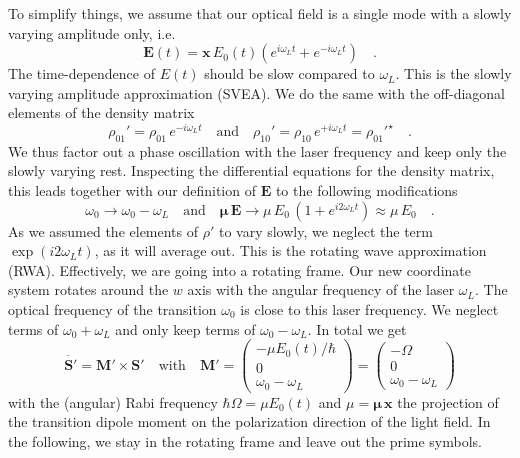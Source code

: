 To simplify things, we assume that our optical field is a single mode with a slowly varying amplitude only, i.e.
\begin{equation}
 \boldsymbol{E}(t) = \boldsymbol{x} \, E_0(t) \left( e^{i \omega_L t} + e^{-i \omega_L t} \right) \quad .
\end{equation}
The time-dependence of $E(t)$ should be slow compared to $\omega_L$. This is the slowly varying amplitude approximation (SVEA). We do the same with the off-diagonal elements of the density matrix
\begin{equation}
 \rho_{01}' = \rho_{01} \, e^{-i \omega_L t}  \quad \text{and} \quad
 \rho_{10}' = \rho_{10} \, e^{+i \omega_L t} = \rho_{01}'^\star \quad .
\end{equation}
We thus factor out a phase oscillation with the laser frequency and keep only the slowly varying rest. Inspecting the differential equations for the density matrix, this leads together with our definition of $\boldsymbol{E}$ to the following modifications
\begin{equation}
 \omega_0 \rightarrow \omega_0 - \omega_L \quad \text{and} \quad 
 \boldsymbol{\mu} \, \boldsymbol{E}  \rightarrow \mu \, E_0  \, ( 1+ e^{i 2\omega_L t} ) \approx \mu \, E_0  \quad .
\end{equation}
As we assumed the elements of $\rho'$ to vary slowly, we neglect the term $\exp(i 2 \omega_L t)$, as it will average out.  This is the rotating wave approximation (RWA). Effectively, we are going into a 
rotating frame. Our new coordinate system rotates around the $w$ axis with the angular frequency of the laser $\omega_L$. The optical frequency of the transition $\omega_0$ is close to this laser frequency. We neglect terms of $\omega_0 + \omega_L$ and only keep terms of  $\omega_0 - \omega_L$. In total we get
\begin{equation}
 \dot{\boldsymbol{S}'} = \boldsymbol{M}'   \times \boldsymbol{S}' 
 \quad \text{with} \quad 
 \boldsymbol{M}'  = 
 \begin{pmatrix}
- \mu    E_0(t) / \hbar \\
0 \\
\omega_0 - \omega_L
 \end{pmatrix} = 
  \begin{pmatrix}
- \Omega \\
0 \\
\omega_0 - \omega_L
 \end{pmatrix} 
\end{equation}
with the (angular) Rabi frequency $\hbar \Omega = \mu    E_0(t) $ and $\mu = \boldsymbol{\mu \, x}$ the projection of the transition dipole moment on the polarization direction of the light field. In the following, we stay in the rotating frame and leave out the prime symbols.


